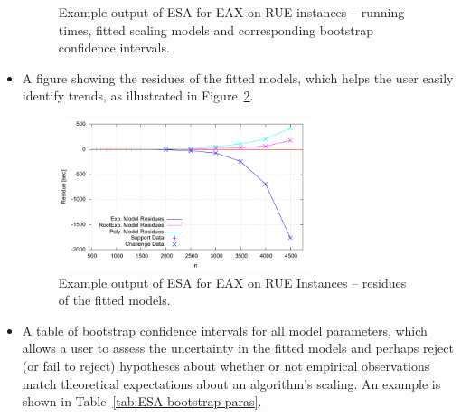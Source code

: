 \documentclass[aic]{iosart2x}
\begin{document}
\begin{itemize}
\begin{figure}[t]
\caption{Example output of ESA for EAX on RUE instances -- running times, fitted scaling models and corresponding bootstrap confidence intervals.}\label{fig:ESA-fitted-models}
\end{figure}

\item A figure showing the residues of the fitted models, which helps the user easily identify trends, as illustrated in Figure~\ref{fig:ESA-fitted-residues}.
\begin{figure}[t]
\noindent \begin{centering}
\includegraphics[width=0.7\textwidth]{EAX_fittedResidues} \vspace{-5mm}

\par\end{centering}

\caption{Example output of ESA for EAX on RUE Instances -- residues of the fitted models.}\label{fig:ESA-fitted-residues}
\end{figure}


\item A table of bootstrap confidence intervals for all model parameters, which allows a user to assess the uncertainty in the fitted models and perhaps reject (or fail to reject) hypotheses about whether or not empirical observations match theoretical expectations about an algorithm's scaling. An example is shown in Table~\ref{tab:ESA-bootstrap-paras}.
\begin{table}[t]
\begin{centering}
\caption{\label{tab:ESA-bootstrap-paras}Confidence intervals for scaling models from Table~\ref{tab:ESA-fitted-models}}
\medskip{}


\end{centering}
\end{table}
\end{itemize}
\end{document}
